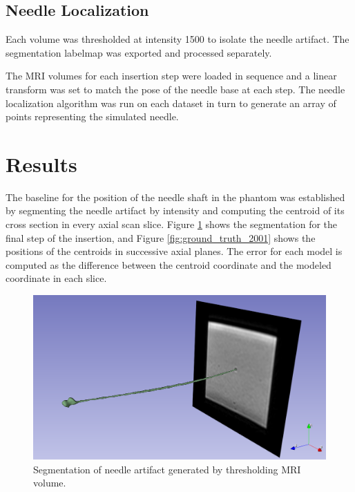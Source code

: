 \subsection{Needle Localization}

Each volume was thresholded at intensity 1500 to isolate the needle artifact. The segmentation labelmap was exported and processed separately.

The MRI volumes for each insertion step were loaded in sequence and a linear transform was set to match the pose of the needle base at each step. The needle localization algorithm was run on each dataset in turn to generate an array of points representing the simulated needle.

\section{Results}



The baseline for the position of the needle shaft in the phantom was established by segmenting the needle artifact by intensity and computing the centroid of its cross section in every axial scan slice. Figure \ref{fig:seg_2001} shows the segmentation for the final step of the insertion, and Figure \ref{fig:ground_truth_2001} shows the positions of the centroids in successive axial planes. The error for each model is computed as the difference between the centroid coordinate and the modeled coordinate in each slice.

\begin{figure}[h]
\includegraphics[width=1.0\textwidth]{Fig/chap5/segmented_artifact_2001.png}
\caption{Segmentation of needle artifact generated by thresholding MRI volume.}
\label{fig:seg_2001}
\end{figure}

